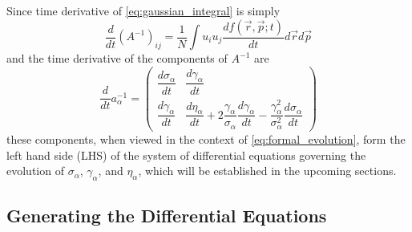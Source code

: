 Since time derivative of \ref{eq:gaussian_integral} is simply
\begin{equation} \label{eq:gaussian_integral_dt}
  \frac{d}{dt}(A^{-1})_{ij} = \frac{1}{N} \int u_i u_j \frac{df(\vec{r}, \vec{p}; t)}{dt} d\vec{r} d\vec{p}
\end{equation}
and the time derivative of the components of $A^{-1}$ are
\begin{equation} \label{eq:dainvdt}
  \frac{d}{dt} a^{-1}_{\alpha} = 
  \begin{pmatrix}
    \dfrac{d\sigma_{\alpha}}{dt} & \dfrac{d\gamma_{\alpha}}{dt} \\
    \dfrac{d\gamma_{\alpha}}{dt} & \dfrac{d\eta_{\alpha}}{dt} + 2\dfrac{\gamma_{\alpha}}{\sigma_{\alpha}}\dfrac{d\gamma_{\alpha}}{dt}- \dfrac{\gamma^{2}_{\alpha}}{\sigma^{2}_{\alpha}}\dfrac{d\sigma_{\alpha}}{dt}
  \end{pmatrix}
\end{equation}
these components, when viewed in the context of \ref{eq:formal_evolution}, form the left hand side (LHS) of the system of differential equations governing the evolution of $\sigma_{\alpha}$, $\gamma_{\alpha}$, and $\eta_{\alpha}$, which will be established in the upcoming sections.

\subsection{Generating the Differential Equations}

